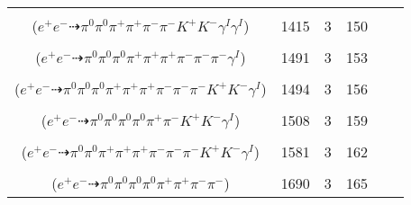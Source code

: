 \documentclass[landscape]{article}
\newcounter{rownumbers}
\newcommand\rn{\stepcounter{rownumbers}\arabic{rownumbers}}
\newcommand{\EOL}{\\} %
\newcommand{\topoTags}[1]{#1} %
\begin{document}
\begin{longtable}{clcccc}
\rn & \makecell[l]{ $ 
e^{+} e^{-} \rightarrow \pi^{0} \pi^{0} \rho^{0} \pi^{+} \pi^{-} K^{+} K^{-} \gamma^{I} \gamma^{I} ,
\rho^{0} \rightarrow \pi^{+} \pi^{-} 
$ \\ ($
e^{+} e^{-} \dashrightarrow \pi^{0} \pi^{0} \pi^{+} \pi^{+} \pi^{-} \pi^{-} K^{+} K^{-} \gamma^{I} \gamma^{I} 
$) } & \topoTags{1415 & }3 & 150 \EOL

\rn & \makecell[l]{ $ 
e^{+} e^{-} \rightarrow \pi^{0} \pi^{+} \pi^{+} \pi^{-} \rho^{-} \omega \gamma^{I} ,
\rho^{-} \rightarrow \pi^{0} \pi^{-} ,
\omega \rightarrow \pi^{0} \pi^{+} \pi^{-} 
$ \\ ($
e^{+} e^{-} \dashrightarrow \pi^{0} \pi^{0} \pi^{0} \pi^{+} \pi^{+} \pi^{+} \pi^{-} \pi^{-} \pi^{-} \gamma^{I} 
$) } & \topoTags{1491 & }3 & 153 \EOL

\rn & \makecell[l]{ $ 
e^{+} e^{-} \rightarrow \pi^{0} \rho^{0} \pi^{+} \pi^{-} \rho^{+} \rho^{-} K^{+} K^{-} \gamma^{I} ,
\rho^{0} \rightarrow \pi^{+} \pi^{-} ,
\rho^{+} \rightarrow \pi^{0} \pi^{+} ,
\rho^{-} \rightarrow \pi^{0} \pi^{-} 
$ \\ ($
e^{+} e^{-} \dashrightarrow \pi^{0} \pi^{0} \pi^{0} \pi^{+} \pi^{+} \pi^{+} \pi^{-} \pi^{-} \pi^{-} K^{+} K^{-} \gamma^{I} 
$) } & \topoTags{1494 & }3 & 156 \EOL

\rn & \makecell[l]{ $ 
e^{+} e^{-} \rightarrow \pi^{0} \pi^{0} \pi^{0} \pi^{-} \rho^{+} K^{+} K^{-} \gamma^{I} ,
\rho^{+} \rightarrow \pi^{0} \pi^{+} 
$ \\ ($
e^{+} e^{-} \dashrightarrow \pi^{0} \pi^{0} \pi^{0} \pi^{0} \pi^{+} \pi^{-} K^{+} K^{-} \gamma^{I} 
$) } & \topoTags{1508 & }3 & 159 \EOL

\rn & \makecell[l]{ $ 
e^{+} e^{-} \rightarrow \pi^{0} \rho^{0} \pi^{+} \pi^{-} \pi^{-} \rho^{+} K^{+} K^{-} \gamma^{I} ,
\rho^{0} \rightarrow \pi^{+} \pi^{-} ,
\rho^{+} \rightarrow \pi^{0} \pi^{+} 
$ \\ ($
e^{+} e^{-} \dashrightarrow \pi^{0} \pi^{0} \pi^{+} \pi^{+} \pi^{+} \pi^{-} \pi^{-} \pi^{-} K^{+} K^{-} \gamma^{I} 
$) } & \topoTags{1581 & }3 & 162 \EOL

\rn & \makecell[l]{ $ 
e^{+} e^{-} \rightarrow \pi^{0} \pi^{0} \pi^{0} \rho^{0} \pi^{+} \rho^{-} ,
\rho^{0} \rightarrow \pi^{+} \pi^{-} ,
\rho^{-} \rightarrow \pi^{0} \pi^{-} 
$ \\ ($
e^{+} e^{-} \dashrightarrow \pi^{0} \pi^{0} \pi^{0} \pi^{0} \pi^{+} \pi^{+} \pi^{-} \pi^{-} 
$) } & \topoTags{1690 & }3 & 165 \EOL


\end{longtable}
\end{document}
